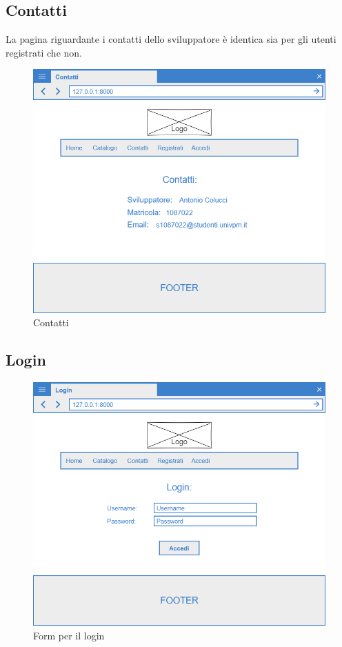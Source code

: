 \documentclass[12pt,a4paperS]{report}
\begin{document}
\begin{normalsize}
			\subsection{Contatti}
				La pagina riguardante i contatti dello sviluppatore è identica sia per gli utenti registrati che non.
				\newline
				\begin{figure}[H]
					\centering
					\includegraphics[width=1\textwidth, height=1\textheight, keepaspectratio]{Mockup/Contatti.png}
					\caption{Contatti}
				\end{figure}
				
			
			\subsection{Login}
				\begin{figure}[H]
					\centering
					\includegraphics[width=1\textwidth, height=1\textheight, keepaspectratio]{Mockup/Login.png}
					\caption{Form per il login}
				\end{figure}
			

\end{normalsize}
\end{document}
